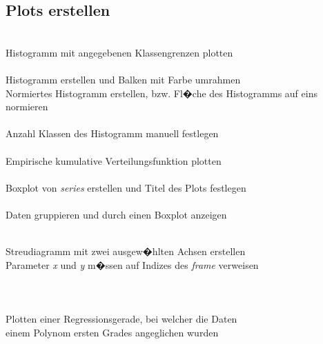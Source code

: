 \documentclass{article}
\begin{document}
\begin{multicols*}{3}
\subsection*{Plots erstellen}
 \\
Histogramm mit angegebenen Klassengrenzen plotten \\

 \\
Histogramm erstellen und Balken mit Farbe umrahmen \\

Normiertes Histogramm erstellen, bzw. Fl�che des Histogramms auf eins normieren\\

 \\
Anzahl Klassen des Histogramm manuell festlegen \\

 \\
Empirische kumulative Verteilungsfunktion plotten \\

 \\
Boxplot von \textit{series} erstellen und Titel des Plots festlegen \\

 \\
Daten gruppieren und durch einen Boxplot anzeigen

 \\
Streudiagramm mit zwei ausgew�hlten Achsen erstellen \\
Parameter \textit{x} und \textit{y} m�ssen auf Indizes des \textit{frame} verweisen \\

 \\
 \\
 \\
Plotten einer Regressionsgerade, bei welcher die Daten \\
einem Polynom ersten Grades angeglichen wurden \\


\end{multicols*}
\end{document}
